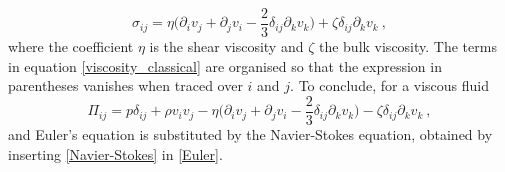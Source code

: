 \begin{equation} 
\sigma_{ij} = \eta \biggl( \partial_i v_j + \partial_j v_i -\frac{2}{3} \delta_{ij} \partial_k v_k \biggr) + \zeta \delta_{ij} \partial_{k} v_k \: ,
\label{viscosity_classical}
\end{equation}
%
where the coefficient $\eta$ is the shear viscosity and $\zeta$ the bulk viscosity. The terms in equation \ref{viscosity_classical} are organised so that the expression in parentheses vanishes when traced over $i$ and $j$. To conclude, for a viscous fluid
\begin{equation}
\Pi_{ij} = p \delta_{ij} + \rho v_i v_j - \eta \biggl( \partial_i v_j + \partial_j v_i -\frac{2}{3} \delta_{ij} \partial_k v_k \biggr) - \zeta \delta_{ij} \partial_{k} v_k \: ,
\label{Navier-Stokes}
\end{equation}
%
and Euler's equation is substituted by the Navier-Stokes equation, obtained by inserting \ref{Navier-Stokes} in \ref{Euler}.


